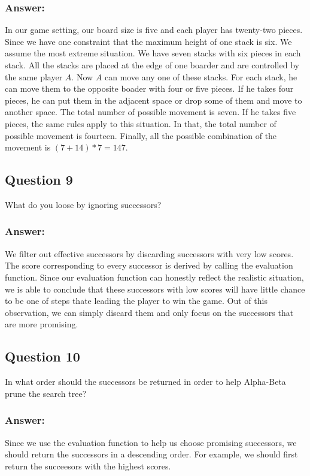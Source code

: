 \documentclass[12pt, a4paper]{report}
\begin{document}
\subsubsection{Answer:}
In our game setting, our board size is five and each player has twenty-two pieces. Since we have one constraint that the maximum height of one stack is six. We assume the most extreme situation. We have seven stacks with six pieces in each stack. All the stacks are placed at the edge of one boarder and are controlled by the same player $A$. Now $A$ can move any one of these stacks. For each stack, he can move them to the opposite boader with four or five pieces. If he takes four pieces, he can put them in the adjacent space or drop some of them and move to another space. The total number of possible movement is seven. If he takes five pieces, the same rules apply to this situation. In that, the total number of possible movement is fourteen. Finally, all the possible combination of the movement is $(7+14)*7=147$.
\subsection{Question 9}
What do you loose by ignoring successors?
\subsubsection{Answer:}
We filter out effective successors by discarding successors with very low scores. The score corresponding to every successor is derived by calling the evaluation function. Since our evaluation function can honestly reflect the realistic situation, we is able to conclude that these successors with low scores will have little chance to be one of steps thate leading the player to win the game. Out of this observation, we can simply discard them and only focus on the successors that are more promising. 


\subsection{Question 10}
In what order should the successors be returned in order to help Alpha-Beta prune the search tree?
\subsubsection{Answer:}
Since we use the evaluation function to help us choose promising successors, we should return the successors in a descending order. For example, we should first return the succeesors with the highest scores. 
\end{document}
